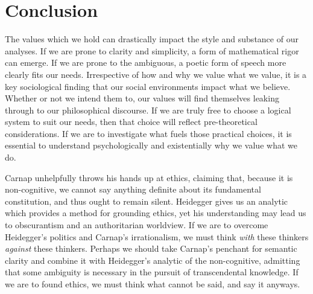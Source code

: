 \documentclass[leqno, 12pt]{turabian-researchpaper}
\begin{document}
	\section{Conclusion}

	The values which we hold can drastically impact the style and substance of our
	analyses. If we are prone to clarity and simplicity, a form of mathematical
	rigor can emerge. If we are prone to the ambiguous, a poetic form of speech
	more clearly fits our needs. Irrespective of how and why we value what we value,
	it is a key sociological finding that our social environments impact what we
	believe. Whether or not we intend them to, our values will find themselves
	leaking through to our philosophical discourse. If we are truly free to choose
	a logical system to suit our needs, then that choice will reflect pre-theoretical
	considerations. If we are to investigate what fuels those practical choices,
	it is essential to understand psychologically and existentially why we value
	what we do.

	Carnap unhelpfully throws his hands up at ethics, claiming that, because it is
	non-cognitive, we cannot say anything definite about its fundamental constitution,
	and thus ought to remain silent. Heidegger gives us an analytic which provides
	a method for grounding ethics, yet his understanding may lead us to
	obscurantism and an authoritarian worldview. If we are to overcome Heidegger's
	politics and Carnap's irrationalism, we must think \emph{with} these thinkers \emph{against}
	these thinkers. Perhaps we should take Carnap's penchant for semantic clarity and
	combine it with Heidegger's analytic of the non-cognitive, admitting that some
	ambiguity is necessary in the pursuit of transcendental knowledge. If we are to
	found ethics, we must think what cannot be said, and say it anyways.

	\centerline{} \break

	\printbibliography
\end{document}
